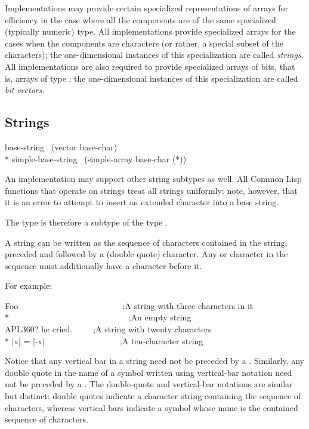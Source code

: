 Implementations may provide certain specialized representations of
arrays for efficiency in the case where all the components are of
the same specialized (typically numeric) type.  All implementations
provide specialized arrays for the cases when the components
are characters (or rather, a special subset of the characters);
the one-dimensional instances of
this specialization are called \emph{strings}.
All implementations are also required to provide specialized arrays
of bits, that is, arrays of type ;
the one-dimensional instances of
this specialization are called \emph{bit-vectors}.

\subsection{Strings}
\label{STRING-TYPE-SECTION}

\begin{lisp}
base-string \EQ\ (vector base-char) \\*
simple-base-string \EQ\ (simple-array base-char (*))
\end{lisp}
An implementation may support
other string subtypes as well.  All Common Lisp functions that operate
on strings treat all strings uniformly; note, however,
that it is an error to attempt to insert
an extended character into a base string.

The type  is therefore a subtype of the type .

A string can be written as the sequence of characters contained in the
string, preceded and followed by a \cd{{\Xdquote}} (double quote) character.
Any \cd{{\Xdquote}} or \cd{{\Xbackslash}} character in the sequence must additionally
have a \cd{{\Xbackslash}} character before it.

For example:
\begin{lisp}
{\Xdquote}Foo{\Xdquote}~~~~~~~~~~~~~~~~~~~~~~~~~;\textrm{A string with three characters in it} \\*
{\Xdquote}{\Xdquote}~~~~~~~~~~~~~~~~~~~~~~~~~~~~;\textrm{An empty string} \\
{\Xdquote}{\Xbackslash}{\Xdquote}APL{\Xbackslash}{\Xbackslash}360?{\Xbackslash}{\Xdquote} he cried.{\Xdquote}~~~~~;\textrm{A string with twenty characters} \\*
{\Xdquote}|x| = |-x|{\Xdquote}~~~~~~~~~~~~~~~~~~;\textrm{A ten-character string}
\end{lisp}
Notice that any vertical bar \cd{|} in a string need not be
preceded by a \cd{{\Xbackslash}}.  Similarly, any double quote in the name
of a symbol written using vertical-bar notation need not be
preceded by a \cd{{\Xbackslash}}.  The double-quote and vertical-bar notations
are similar but distinct: double quotes indicate a character string
containing the sequence of characters,
whereas vertical bars indicate a symbol whose name is the contained
sequence of characters.

